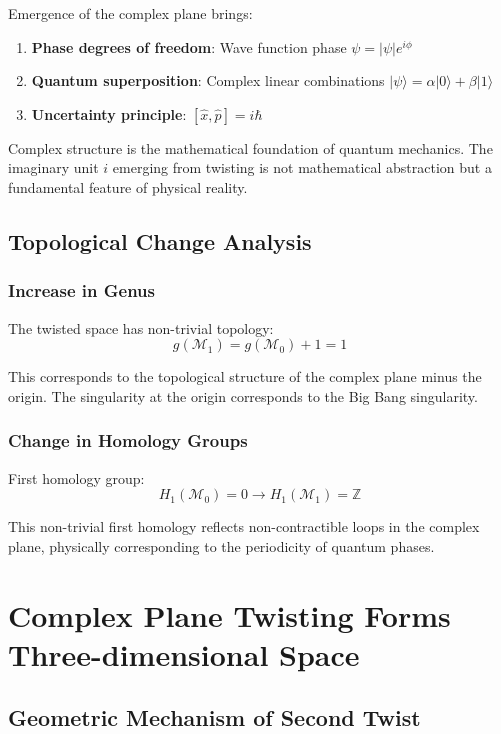 \documentclass[11pt]{article}
\begin{document}
Emergence of the complex plane brings:
\begin{enumerate}
\item \textbf{Phase degrees of freedom}: Wave function phase $\psi = |\psi|e^{i\phi}$
\item \textbf{Quantum superposition}: Complex linear combinations $|\psi\rangle = \alpha|0\rangle + \beta|1\rangle$
\item \textbf{Uncertainty principle}: $[\hat{x}, \hat{p}] = i\hbar$
\end{enumerate}

Complex structure is the mathematical foundation of quantum mechanics. The imaginary unit $i$ emerging from twisting is not mathematical abstraction but a fundamental feature of physical reality.

\subsection{Topological Change Analysis}

\subsubsection{Increase in Genus}

The twisted space has non-trivial topology:
$$g(\mathcal{M}_1) = g(\mathcal{M}_0) + 1 = 1$$

This corresponds to the topological structure of the complex plane minus the origin. The singularity at the origin corresponds to the Big Bang singularity.

\subsubsection{Change in Homology Groups}

First homology group:
$$H_1(\mathcal{M}_0) = 0 \to H_1(\mathcal{M}_1) = \mathbb{Z}$$

This non-trivial first homology reflects non-contractible loops in the complex plane, physically corresponding to the periodicity of quantum phases.

\section{Complex Plane Twisting Forms Three-dimensional Space}

\subsection{Geometric Mechanism of Second Twist}
\end{document}
